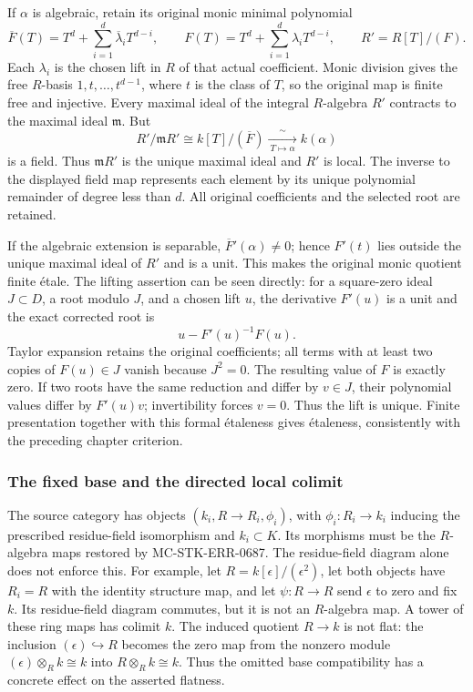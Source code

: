 If \(\alpha\) is algebraic, retain its original monic minimal polynomial \[
 \overline F(T)=T^d+\sum_{i=1}^{d}\overline\lambda_iT^{d-i},
 \qquad
 F(T)=T^d+\sum_{i=1}^{d}\lambda_iT^{d-i},
 \qquad R'=R[T]/(F).
\] Each \(\lambda_i\) is the chosen lift in \(R\) of that actual coefficient. Monic division gives the free \(R\)-basis \(1,t,\ldots,t^{d-1}\), where \(t\) is the class of \(T\), so the original map is finite free and injective. Every maximal ideal of the integral \(R\)-algebra \(R'\) contracts to the maximal ideal \(\mathfrak m\). But \[
 R'/\mathfrak mR'\cong k[T]/(\overline F)
       \xrightarrow[\ T\mapsto\alpha\ ]{\ \sim\ } k(\alpha)
\] is a field. Thus \(\mathfrak mR'\) is the unique maximal ideal and \(R'\) is local. The inverse to the displayed field map represents each element by its unique polynomial remainder of degree less than \(d\). All original coefficients and the selected root are retained.

If the algebraic extension is separable, \(\overline F'(\alpha)\ne0\); hence \(F'(t)\) lies outside the unique maximal ideal of \(R'\) and is a unit. This makes the original monic quotient finite étale. The lifting assertion can be seen directly: for a square-zero ideal \(J\subset D\), a root modulo \(J\), and a chosen lift \(u\), the derivative \(F'(u)\) is a unit and the exact corrected root is \[
 u-F'(u)^{-1}F(u).
\] Taylor expansion retains the original coefficients; all terms with at least two copies of \(F(u)\in J\) vanish because \(J^2=0\). The resulting value of \(F\) is exactly zero. If two roots have the same reduction and differ by \(v\in J\), their polynomial values differ by \(F'(u)v\); invertibility forces \(v=0\). Thus the lift is unique. Finite presentation together with this formal étaleness gives étaleness, consistently with the preceding chapter criterion.

\subsubsection{The fixed base and the directed local colimit}\label{algebra-proof-064-the-fixed-base-and-the-directed-local-colimit}

The source category has objects \((k_i,R\to R_i,\phi_i)\), with \(\phi_i:R_i\to k_i\) inducing the prescribed residue-field isomorphism and \(k_i\subset K\). Its morphisms must be the \(R\)-algebra maps restored by MC-STK-ERR-0687. The residue-field diagram alone does not enforce this. For example, let \(R=k[\epsilon]/(\epsilon^2)\), let both objects have \(R_i=R\) with the identity structure map, and let \(\psi:R\to R\) send \(\epsilon\) to zero and fix \(k\). Its residue-field diagram commutes, but it is not an \(R\)-algebra map. A tower of these ring maps has colimit \(k\). The induced quotient \(R\to k\) is not flat: the inclusion \((\epsilon)\hookrightarrow R\) becomes the zero map from the nonzero module \((\epsilon)\otimes_R k\cong k\) into \(R\otimes_R k\cong k\). Thus the omitted base compatibility has a concrete effect on the asserted flatness.


